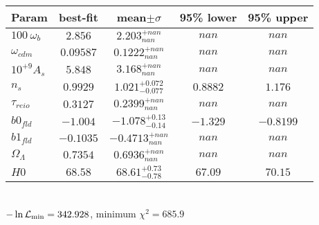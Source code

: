 \begin{tabular}{|l|c|c|c|c|} 
 \hline 
Param & best-fit & mean$\pm\sigma$ & 95\% lower & 95\% upper \\ \hline 
$100~\omega_{b }$ &$2.856$ & $2.203_{nan}^{+nan}$ & $nan$ & $nan$ \\ 
$\omega_{cdm }$ &$0.09587$ & $0.1222_{nan}^{+nan}$ & $nan$ & $nan$ \\ 
$10^{+9}A_{s }$ &$5.848$ & $3.168_{nan}^{+nan}$ & $nan$ & $nan$ \\ 
$n_{s }$ &$0.9929$ & $1.021_{-0.077}^{+0.072}$ & $0.8882$ & $1.176$ \\ 
$\tau_{reio }$ &$0.3127$ & $0.2399_{nan}^{+nan}$ & $nan$ & $nan$ \\ 
$b0_{fld }$ &$-1.004$ & $-1.078_{-0.14}^{+0.13}$ & $-1.329$ & $-0.8199$ \\ 
$b1_{fld }$ &$-0.1035$ & $-0.4713_{nan}^{+nan}$ & $nan$ & $nan$ \\ 
$\Omega_{\Lambda }$ &$0.7354$ & $0.6936_{nan}^{+nan}$ & $nan$ & $nan$ \\ 
$H0$ &$68.58$ & $68.61_{-0.78}^{+0.73}$ & $67.09$ & $70.15$ \\ 
\hline 
 \end{tabular} \\ 
$-\ln{\cal L}_\mathrm{min} =342.928$, minimum $\chi^2=685.9$ \\ 
